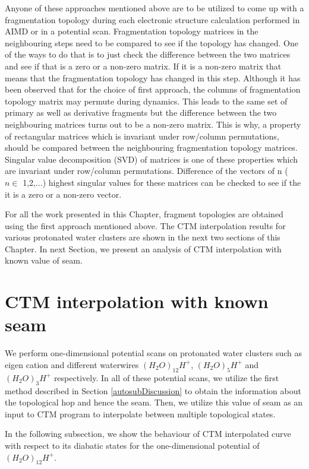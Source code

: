 Anyone of these approaches mentioned above are to be utilized to come up with a
fragmentation topology during each electronic structure calculation performed in
AIMD or in a potential scan. Fragmentation topology matrices in the neighbouring
steps need to be compared to see if the topology has changed. One of the ways to
do that is to just check the difference between the two matrices and see if that
is a zero or a non-zero matrix. If it is a non-zero matrix that means that the
fragmentation topology has changed in this step. Although it has been observed
that for the choice of first approach, the columns of fragmentation topology
matrix may permute during dynamics. This leads to the same set of primary as
well as derivative fragments but the difference between the two neighbouring
matrices turns out to be a non-zero matrix. This is why, a property of rectangular
matrices which is invariant under row/column permutations, should be compared
between the neighbouring fragmentation topology matrices. Singular value
decomposition (SVD) of matrices is one of these properties which are invariant
under row/column permutations. Difference of the vectors of n ( $n \in$ {1,2,...}) highest
singular values for these matrices can be checked to see if the it is a zero or
a non-zero vector.
\newcommand{\N}{\mathbb{N}}

For all the work presented in this Chapter, fragment topologies are obtained
using the first approach mentioned above. The CTM interpolation results for various
protonated water clusters are shown in the next two sections of this Chapter.
In next Section, we present an analysis of CTM interpolation with known value of
seam.

\section{CTM interpolation with known seam}
We perform one-dimensional potential scans on protonated water clusters such as eigen
cation and different waterwires $(H_{2}O)_{12}H^+$, $(H_{2}O)_{5}H^+$ and
$(H_{2}O)_{3}H^+$ respectively. In all of these potential scans, we utilize the
first method described in Section \ref{autosubDiscussion} to obtain the information
about the topological hop and hence the seam. Then, we utilize this value of seam as
an input to CTM program to interpolate between multiple topological states.

In the following subsection, we show the behaviour of CTM interpolated curve with
respect to its diabatic states for the one-dimensional potential of $(H_{2}O)_{12}H^+$.

